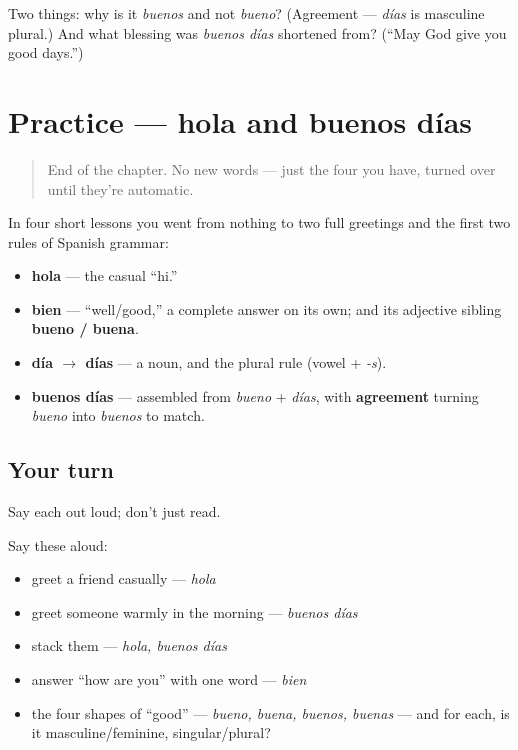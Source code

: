 \begin{tcolorbox}[breakable,colback=teal!4,colframe=teal!35!black,title={Before you move on}]
Two things: why is it \emph{buenos} and not \emph{bueno}? (Agreement — \emph{días} is masculine plural.) And what blessing was \emph{buenos días} shortened from? (\textquotedblleft{}May God give you good days.\textquotedblright{})
\end{tcolorbox}
\section[Practice]{Practice — hola and buenos días}

\label{lesson:ES-C01-practice}



\begin{quote}
End of the chapter. No new words — just the four you have, turned over until they're automatic.
\end{quote}

\begin{grammarlens}[title={What you've built}]
In four short lessons you went from nothing to two full greetings and the first two rules of Spanish grammar:

\begin{itemize}
\raggedright
  \item \textbf{hola} — the casual \textquotedblleft{}hi.\textquotedblright{}
  \item \textbf{bien} — \textquotedblleft{}well/good,\textquotedblright{} a complete answer on its own; and its adjective sibling \textbf{bueno / buena}.
  \item \textbf{día $\to$ días} — a noun, and the plural rule (vowel + \emph{-s}).
  \item \textbf{buenos días} — assembled from \emph{bueno} + \emph{días}, with \textbf{agreement} turning \emph{bueno} into \emph{buenos} to match.
\end{itemize}
\end{grammarlens}

\subsection*{Your turn}
Say each out loud; don't just read.

Say these aloud:

\begin{itemize}
\raggedright
  \item greet a friend casually — \emph{hola}
  \item greet someone warmly in the morning — \emph{buenos días}
  \item stack them — \emph{hola, buenos días}
  \item answer \textquotedblleft{}how are you\textquotedblright{} with one word — \emph{bien}
  \item the four shapes of \textquotedblleft{}good\textquotedblright{} — \emph{bueno, buena, buenos, buenas} — and for each, is it masculine/feminine, singular/plural?
\end{itemize}

